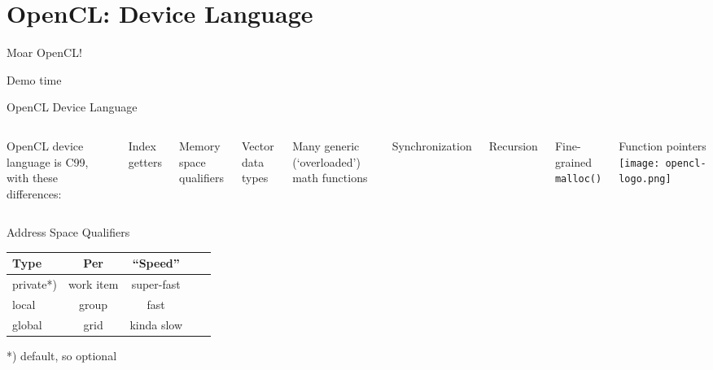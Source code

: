 \documentclass[english,compress]{beamer}
\begin{document}
\section{OpenCL: Device Language}
\begin{frame}{Moar OpenCL!}
  \begin{center}
  \Huge Demo time
  \end{center}
\end{frame}
\begin{frame}{OpenCL Device Language}
  \begin{columns}
      OpenCL device language is C99, with these differences:

      \medskip
      \plusball Index getters

      \plusball Memory space qualifiers

      \plusball Vector data types 

      \plusball Many generic (`overloaded') math functions

      \plusball Synchronization

      \minusball Recursion

      \minusball Fine-grained \texttt{malloc()}

      \minusball Function pointers
      \texttt{[image: opencl-logo.png]}
  \end{columns}
\end{frame}

%

\begin{frame}{Address Space Qualifiers}

  \begin{center}
  \begin{tabular}{p{5em}cccp{2.8cm}}
    \hline
    \textbf{Type} & \textbf{Per} & \textbf{``Speed''} \\
    \hline
    private*) & work item & super-fast\\
    local & group & fast \\
    global & grid & kinda slow \\
    \hline
  \end{tabular}

  \bigskip
  *) default, so optional
  \end{center}
\end{frame}
\end{document}
